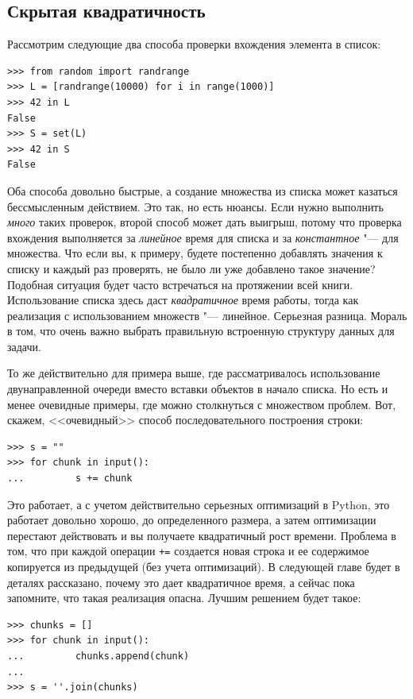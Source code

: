 \subsection{Скрытая квадратичность}
Рассмотрим следующие два способа проверки вхождения элемента в список:
\begin{lstlisting}
>>> from random import randrange
>>> L = [randrange(10000) for i in range(1000)]
>>> 42 in L
False
>>> S = set(L)
>>> 42 in S
False
\end{lstlisting}

Оба способа довольно быстрые, а создание множества из списка может казаться бессмысленным действием. Это так, но есть нюансы. Если нужно выполнить \textit{много} таких проверок, второй способ может дать выигрыш, потому что проверка вхождения выполняется за \textit{линейное} время для списка и за \textit{константное} "--- для множества. Что если вы, к примеру, будете постепенно добавлять значения к списку и каждый раз проверять, не было ли уже добавлено такое значение? Подобная ситуация будет часто встречаться на протяжении всей книги. Использование списка здесь даст \textit{квадратичное} время работы, тогда как реализация с использованием множеств "--- линейное. Серьезная разница. Мораль в том, что очень важно выбрать правильную встроенную структуру данных для задачи.

То же действительно для примера выше, где рассматривалось использование двунаправленной очереди вместо вставки объектов в начало списка. Но есть и менее очевидные примеры, где можно столкнуться с множеством проблем. Вот, скажем, <<очевидный>> способ последовательного построения строки:
\begin{lstlisting}
>>> s = ""
>>> for chunk in input():
... 		s += chunk
\end{lstlisting}

Это работает, а с учетом действительно серьезных оптимизаций в Python, это работает довольно хорошо, до определенного размера, а затем оптимизации перестают действовать и вы получаете квадратичный рост времени. Проблема в том, что при каждой операции \texttt{+=} создается новая строка и ее содержимое копируется из предыдущей (без учета оптимизаций). В следующей главе будет в деталях рассказано, почему это дает квадратичное время, а сейчас пока запомните, что такая реализация опасна. Лучшим решением будет такое:
\begin{lstlisting}
>>> chunks = []
>>> for chunk in input():
...			chunks.append(chunk)
...
>>> s = ''.join(chunks)
\end{lstlisting}


